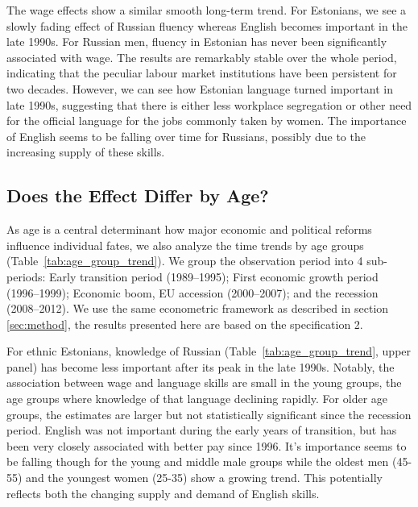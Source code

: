 \documentclass[12pt, a4paper]{article}
\begin{document}
The wage effects show a similar smooth long-term trend.  For Estonians, we
see a slowly fading effect of Russian fluency whereas
English becomes important in the late 1990s.  For Russian men, fluency in Estonian
has never been significantly associated with wage.
The results are remarkably stable over the whole period, indicating
that the peculiar labour market institutions have been persistent for
two decades.  However, we can see how Estonian language turned
important in late 1990s, suggesting that there is either less
workplace segregation or other need for the official language for
the jobs commonly taken by women.  The
importance of English seems to be falling over time for Russians, possibly
due to the increasing supply of these skills. 


\subsection{Does the Effect Differ by Age?}
\label{sec:age_groups}

As age is a central determinant how major economic and political
reforms influence individual fates, 
we also analyze the time trends by age groups
(Table~\ref{tab:age_group_trend}).
We group the observation period into 4 sub-periods: Early transition period
(1989--1995); First economic growth period (1996--1999);
Economic boom, EU accession (2000--2007); and the recession
(2008--2012).
We use the same econometric framework as described in section
\ref{sec:method}, the results presented here are based on the specification 2.

For ethnic Estonians, knowledge of Russian
(Table~\ref{tab:age_group_trend}, upper panel) has become less
important after its peak in the late 1990s. Notably, the
association between wage and language skills are small in the
young groups, the age groups where knowledge of that language
declining rapidly.
For older age groups, the estimates are larger but not statistically
significant since the recession period.  English was not important
during the early years of transition, but has been very closely
associated with better pay since 1996.  It's importance seems to be
falling though for the young and middle male groups while the oldest men
(45-55) and the youngest women (25-35) show a growing trend.
This potentially reflects both the changing supply and demand of
English skills.
\end{document}
